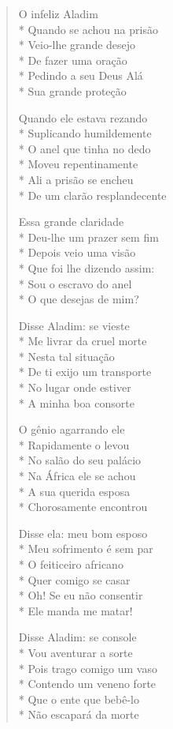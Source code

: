 \begin{verse}
O infeliz Aladim\\*
Quando se achou na prisão\\*
Veio-lhe grande desejo\\*
De fazer uma oração\\*
Pedindo a seu Deus Alá\\*
Sua grande proteção

Quando ele estava rezando\\*
Suplicando humildemente\\*
O anel que tinha no dedo\\*
Moveu repentinamente\\*
Ali a prisão se encheu\\*
De um clarão resplandecente

Essa grande claridade\\*
Deu-lhe um prazer sem fim\\*
Depois veio uma visão\\*
Que foi lhe dizendo assim:\\*
Sou o escravo do anel\\*
O que desejas de mim?

Disse Aladim: se vieste\\*
Me livrar da cruel morte\\*
Nesta tal situação\\*
De ti exijo um transporte\\*
No lugar onde estiver\\*
A minha boa consorte

O gênio agarrando ele\\*
Rapidamente o levou\\*
No salão do seu palácio\\*
Na África ele se achou\\*
A sua querida esposa\\*
Chorosamente encontrou

Disse ela: meu bom esposo\\*
Meu sofrimento é sem par\\*
O feiticeiro africano\\*
Quer comigo se casar\\*
Oh! Se eu não consentir\\*
Ele manda me matar!

Disse Aladim: se console\\*
Vou aventurar a sorte\\*
Pois trago comigo um vaso\\*
Contendo um veneno forte\\*
Que o ente que bebê-lo\\*
Não escapará da morte


\end{verse}
